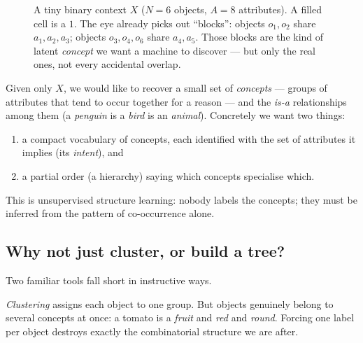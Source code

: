 \documentclass[11pt]{article}
\begin{document}
\begin{figure}[h]
\centering
{}
\caption{A tiny binary context $X$ ($N=6$ objects, $A=8$ attributes). A filled
cell is a $1$. The eye already picks out ``blocks'': objects $o_1,o_2$ share
$a_1,a_2,a_3$; objects $o_3,o_4,o_6$ share $a_4,a_5$. Those blocks are the kind
of latent \emph{concept} we want a machine to discover --- but only the real
ones, not every accidental overlap.}
\label{fig:matrix}
\end{figure}

Given only $X$, we would like to recover a small set of \emph{concepts} ---
groups of attributes that tend to occur together for a reason --- and the
\emph{is-a} relationships among them (a \emph{penguin} is a \emph{bird} is an
\emph{animal}). Concretely we want two things:
\begin{enumerate}
  \item a compact vocabulary of concepts, each identified with the set of
        attributes it implies (its \emph{intent}), and
  \item a partial order (a hierarchy) saying which concepts specialise which.
\end{enumerate}
This is unsupervised structure learning: nobody labels the concepts; they must
be inferred from the pattern of co-occurrence alone.

\subsection{Why not just cluster, or build a tree?}

Two familiar tools fall short in instructive ways.

\emph{Clustering} assigns each object to one group. But objects genuinely
belong to several concepts at once: a tomato is a \emph{fruit} and \emph{red}
and \emph{round}. Forcing one label per object destroys exactly the
combinatorial structure we are after.
\end{document}
